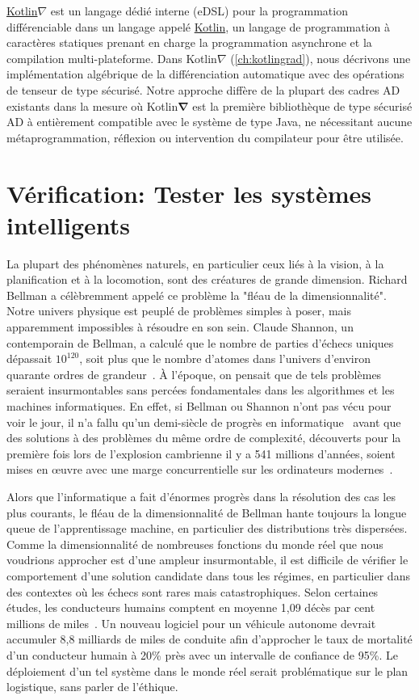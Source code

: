 \href{https://github.com/breandan/kotlingrad/}{Kotlin$\nabla$} est un langage dédié interne (eDSL) pour la programmation différenciable dans un langage appelé \href{https://kotlinlang.org}{Kotlin}, un langage de programmation à caractères statiques prenant en charge la programmation asynchrone et la compilation multi-plateforme. Dans Kotlin$\nabla$ (\autoref{ch:kotlingrad}), nous décrivons une implémentation algébrique de la différenciation automatique avec des opérations de tenseur de type sécurisé. Notre approche diffère de la plupart des cadres AD existants dans la mesure où Kotlin$\mathbf{\nabla}$ est la première bibliothèque de type sécurisé AD à entièrement compatible avec le système de type Java, ne nécessitant aucune métaprogrammation, réflexion ou intervention du compilateur pour être utilisée.

\section{Vérification: Tester les systèmes intelligents}

La plupart des phénomènes naturels, en particulier ceux liés à la vision, à la planification et à la locomotion, sont des créatures de grande dimension. Richard Bellman a célèbremment appelé ce problème la "fléau de la dimensionnalité". Notre univers physique est peuplé de problèmes simples à poser, mais apparemment impossibles à résoudre en son sein. Claude Shannon, un contemporain de Bellman, a calculé que le nombre de parties d'échecs uniques dépassait $10^{120}$, soit plus que le nombre d'atomes dans l'univers d'environ quarante ordres de grandeur~\citep{shannon1950chess}. À l'époque, on pensait que de tels problèmes seraient insurmontables sans percées fondamentales dans les algorithmes et les machines informatiques. En effet, si Bellman ou Shannon n'ont pas vécu pour voir le jour, il n'a fallu qu'un demi-siècle de progrès en informatique~\citep{campbell2002deep} avant que des solutions à des problèmes du même ordre de complexité, découverts pour la première fois lors de l'explosion cambrienne il y a 541 millions d'années, soient mises en œuvre avec une marge concurrentielle sur les ordinateurs modernes~\citep{pratt2015cambrian}.

Alors que l'informatique a fait d'énormes progrès dans la résolution des cas les plus courants, le fléau de la dimensionnalité de Bellman hante toujours la longue queue de l'apprentissage machine, en particulier des distributions très dispersées. Comme la dimensionnalité de nombreuses fonctions du monde réel que nous voudrions approcher est d'une ampleur insurmontable, il est difficile de vérifier le comportement d'une solution candidate dans tous les régimes, en particulier dans des contextes où les échecs sont rares mais catastrophiques. Selon certaines études, les conducteurs humains comptent en moyenne 1,09 décès par cent millions de miles~\citep{kalra2016driving}. Un nouveau logiciel pour un véhicule autonome devrait accumuler 8,8 milliards de miles de conduite afin d'approcher le taux de mortalité d'un conducteur humain à 20\% près avec un intervalle de confiance de 95\%. Le déploiement d'un tel système dans le monde réel serait problématique sur le plan logistique, sans parler de l'éthique.

